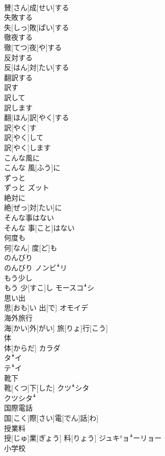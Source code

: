\documentclass[8pt]{extreport}
\begin{document}
\begin{CJK}{UTF8}{min}
\\	賛[さん]成[せい]する	
\\	失敗する	
\\	失[しっ]敗[ぱい]する	
\\	徹夜する	
\\	徹[てつ]夜[や]する	
\\	反対する	
\\	反[はん]対[たい]する	
\\	翻訳する 
\\	訳す 
\\	訳して 
\\	訳します	
\\	翻[ほん]訳[やく]する 
\\	訳[やく]す 
\\	訳[やく]して 
\\	訳[やく]します	
\\	こんな風に	
\\	こんな 風[ふう]に	
\\	ずっと	
\\	ずっと	ズット
\\	絶対に	
\\	絶[ぜっ]対[たい]に	
\\	そんな事はない	
\\	そんな 事[こと]はない	
\\	何度も	
\\	何[なん] 度[ど]も	
\\	のんびり	
\\	のんびり	ノンビꜜリ
\\	もう少し	
\\	もう 少[すこ]し	モースコꜜシ
\\	思い出	
\\	思[おも]い 出[で]	オモイデ
\\	海外旅行	
\\	海[かい]外[がい] 旅[りょ]行[こう]	
\\	体	
\\	体[からだ]	カラダ 
\\	タꜜイ 
\\	テꜜイ
\\	靴下	
\\	靴[くつ]下[した]	クツꜜシタ 
\\	クツシタꜜ
\\	国際電話	
\\	国[こく]際[さい]電[でん]話[わ]	
\\	授業料	
\\	授[じゅ]業[ぎょう] 料[りょう]	ジュキ°ョꜜーリョー
\\	小学校	

\end{CJK}
\end{document}
